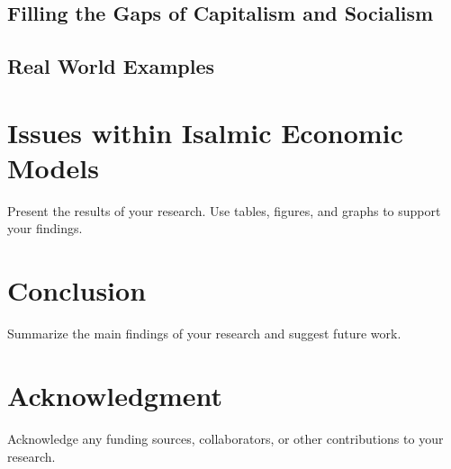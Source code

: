 \documentclass[conference]{IEEEtran}
\begin{document}
\subsection{Filling the Gaps of Capitalism and Socialism}
\subsection{Real World Examples}

\section{Issues within Isalmic Economic Models}
Present the results of your research. Use tables, figures, and graphs to support your findings.

\section{Conclusion}
Summarize the main findings of your research and suggest future work.

\section*{Acknowledgment}
Acknowledge any funding sources, collaborators, or other contributions to your research.



\end{document}
